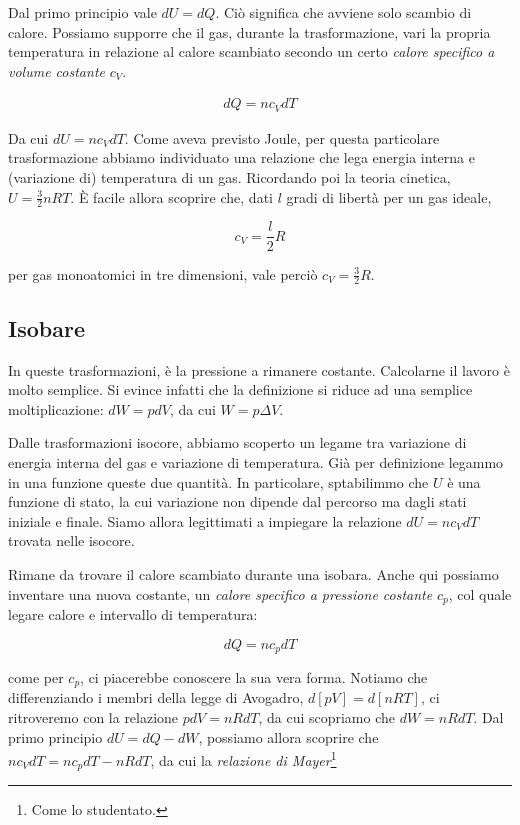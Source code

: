 Dal primo principio vale $dU = dQ$. Ciò significa che avviene solo
scambio di calore. Possiamo supporre che il gas, durante la trasformazione,
vari la propria temperatura in relazione al calore scambiato secondo
un certo \textit{calore specifico a volume costante} $c_V$.

\begin{align}
    dQ = nc_VdT
\end{align}

\noindent Da cui $dU = nc_VdT$. Come aveva previsto Joule, per questa
particolare trasformazione abbiamo individuato una relazione che lega
energia interna e (variazione di) temperatura di un gas. Ricordando
poi la teoria cinetica, $U = \frac32 nRT$. È facile allora scoprire
che, dati $l$ gradi di libertà per un gas ideale,

\[ c_V = \frac{l}{2}R \]

\noindent per gas monoatomici in tre dimensioni, vale perciò $c_V = \frac32 R$.


\subsection{Isobare}
In queste trasformazioni, è la pressione a rimanere costante.
Calcolarne il lavoro è molto semplice. Si evince infatti che
la definizione si riduce ad una semplice moltiplicazione:
$dW = pdV$, da cui $W = p\Delta V$.

Dalle trasformazioni isocore, abbiamo scoperto un legame tra
variazione di energia interna del gas e variazione di temperatura.
Già per definizione legammo in una funzione queste due quantità.
In particolare, sptabilimmo che $U$ è una funzione di stato, la
cui variazione non dipende dal percorso ma dagli stati iniziale
e finale. Siamo allora legittimati a impiegare la relazione
$dU = nc_VdT$ trovata nelle isocore.

Rimane da trovare il calore scambiato durante una isobara. Anche
qui possiamo inventare una nuova costante, un \textit{calore specifico
a pressione costante} $c_p$, col quale legare calore e intervallo
di temperatura:

\[ dQ = nc_pdT \]

\noindent come per $c_p$, ci piacerebbe conoscere la sua vera forma.
Notiamo che differenziando i membri della legge di Avogadro,
$d[pV] = d[nRT]$, ci ritroveremo con la relazione $pdV = nRdT$,
da cui scopriamo che $dW = nRdT$. Dal primo principio $dU = dQ - dW$,
possiamo allora scoprire che $nc_VdT = nc_pdT - nRdT$, da cui
la \textit{relazione di Mayer}\footnote{Come lo studentato.}

